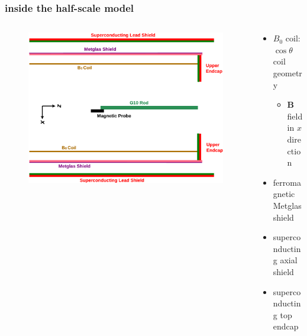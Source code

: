 \documentclass{beamer}
\renewcommand{\vec}{\mathbf}
\begin{document}
\begin{frame}
\frametitle{inside the half-scale model}

    \begin{columns}
    
    \begin{column}{0.5\textwidth}
    \begin{figure}
    \includegraphics[width=\textwidth, angle=90, trim=70px 70px 70px 70px]
    {figures/simplified_structure.eps}
    \end{figure}
    \end{column}

    \pause

    \begin{column}{0.5\textwidth}
    \begin{itemize}
        \item $B_0$ coil: $\cos\theta$ coil geometry
            \begin{itemize}
                \item $\vec{B}$ field in $x$ direction
            \end{itemize}
        \bigskip
        \item ferromagnetic Metglas shield
        \item superconducting axial shield
        \bigskip
        \item superconducting top endcap
    \end{itemize}
    \end{column}

    \end{columns}

\end{frame}
\end{document}
